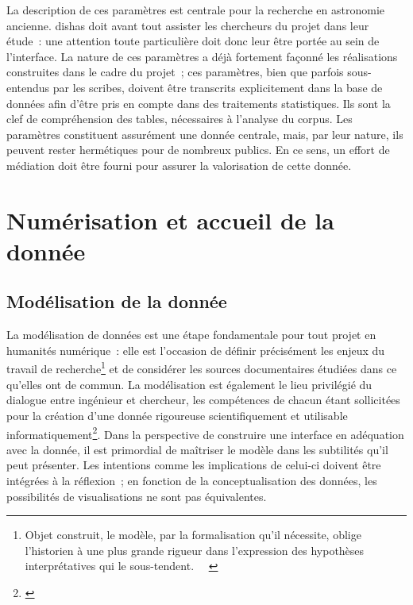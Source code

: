 \documentclass[a4paper,12pt,twoside]{book}
\newcommand{\clearemptydoublepage}{\newpage{\pagestyle{empty}\cleardoublepage}}
\newcommand{\g}[1]{\og#1~\fg}
\newcommand{\dishas}{\gls{dishas}\xspace}
\begin{document}
La description de ces paramètres est centrale pour la recherche en astronomie ancienne. \dishas doit avant tout assister les chercheurs du projet dans leur étude~: une attention toute particulière doit donc leur être portée au sein de l'interface. La nature de ces paramètres a déjà fortement façonné les réalisations construites dans le cadre du projet~; ces paramètres, bien que parfois sous-entendus par les scribes, doivent être transcrits explicitement dans la base de données afin d'être pris en compte dans des traitements statistiques. Ils sont la clef de compréhension des tables, nécessaires à l'analyse du corpus. Les paramètres constituent assurément une donnée centrale, mais, par leur nature, ils peuvent rester hermétiques pour de nombreux publics. En ce sens, un effort de médiation doit être fourni pour assurer la valorisation de cette donnée.

\clearemptydoublepage

\chapter{Numérisation et accueil de la donnée}
	\section{Modélisation de la donnée}
La modélisation de données est une étape fondamentale pour tout projet en humanités numérique~: elle est l'occasion de définir précisément les enjeux du travail de recherche\footnote{\g{Objet construit, le modèle, par la formalisation qu’il nécessite, oblige l’historien à une plus grande rigueur dans l’expression des hypothèses interprétatives qui le sous-tendent.}~ \cite[p.~25]{fargeGoutArchive1997}} et de considérer les sources documentaires étudiées dans ce qu'elles ont de commun. La modélisation est également le lieu privilégié du dialogue entre ingénieur et chercheur, les compétences de chacun étant sollicitées pour la création d'une donnée rigoureuse scientifiquement et utilisable informatiquement\footnote{\cite[§~17-18]{clavertHistorienProgrammeur2012}}. Dans la perspective de construire une interface en adéquation avec la donnée, il est primordial de maîtriser le modèle dans les subtilités qu'il peut présenter. Les intentions comme les implications de celui-ci doivent être intégrées à la réflexion~; en fonction de la conceptualisation des données, les possibilités de visualisations ne sont pas équivalentes.\\
\end{document}

